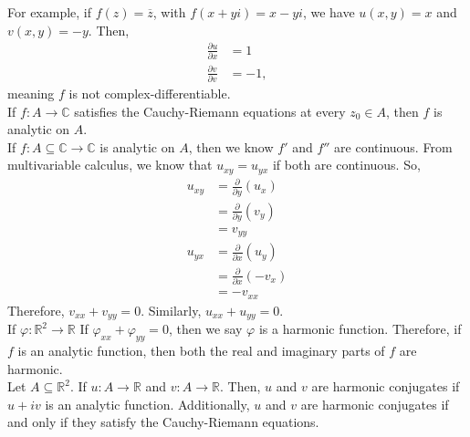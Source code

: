 \documentclass[10pt]{extarticle}
\newcommand{\R}{\mathbb{R}}
\newcommand{\C}{\mathbb{C}}
\begin{document}
  For example, if $f(z) = \overline{z}$, with $f(x + yi) = x - yi$, we have $u(x,y) = x$ and $v(x,y) = -y$. Then,
  \begin{align*}
    \frac{\partial u}{\partial x} &= 1\\
    \frac{\partial v}{\partial v} &= -1,
  \end{align*}
  meaning $f$ is not complex-differentiable.\\

  If $f: A\rightarrow \C$ satisfies the Cauchy-Riemann equations at every $z_0 \in A$, then $f$ is analytic on $A$.\\

  If $f: A\subseteq \C \rightarrow \C$ is analytic on $A$, then we know $f'$ and $f''$ are continuous. From multivariable calculus, we know that $u_{xy} = u_{yx}$ if both are continuous. So,
  \begin{align*}
    u_{xy} &= \frac{\partial}{\partial y}(u_x)\\
           &= \frac{\partial}{\partial y}(v_y)\\
           &= v_{yy}\\
    u_{yx} &= \frac{\partial}{\partial x}(u_y)\\
           &= \frac{\partial }{\partial x}(-v_x)\\
           &= -v_{xx}
  \end{align*}
  Therefore, $v_{xx} + v_{yy} = 0$. Similarly, $u_{xx} + u_{yy} = 0$.\\

  If $\varphi: \R^2\rightarrow \R$ If $\varphi_{xx} + \varphi_{yy} = 0$, then we say $\varphi$ is a harmonic function. Therefore, if $f$ is an analytic function, then both the real and imaginary parts of $f$ are harmonic.\\

  Let $A\subseteq \R^2$. If $u: A\rightarrow \R$ and $v: A\rightarrow \R$. Then, $u$ and $v$ are harmonic conjugates if $u + iv$ is an analytic function. Additionally, $u$ and $v$ are harmonic conjugates if and only if they satisfy the Cauchy-Riemann equations.\\
\end{document}
